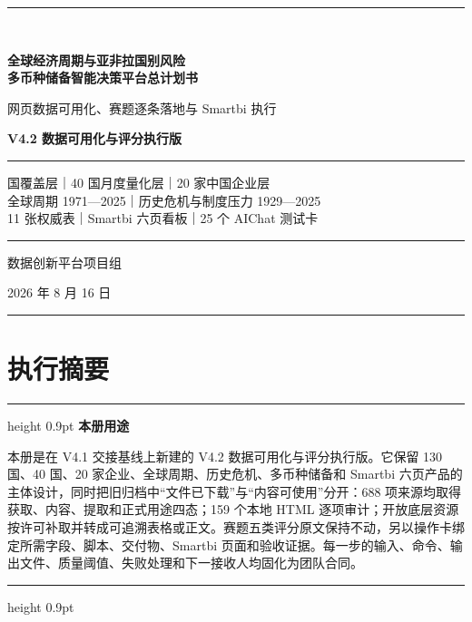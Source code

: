\documentclass[UTF8,fontset=windows,12pt,openany]{ctexbook}
\newenvironment{decisionbox}[1][]{%
  \par\medskip\noindent\begin{center}\begin{minipage}{0.93\textwidth}%
  \color{OceanBlue}\hrule height 0.9pt\vspace{0.45em}%
  \textbf{#1}\par\smallskip\color{black}%
}{%
  \par\vspace{0.35em}\color{OceanBlue}\hrule height 0.9pt%
  \end{minipage}\end{center}\medskip%
}
\begin{document}
\begin{titlepage}
  \pagecolor{PaleBlue}
  \centering
  \vspace*{1.6cm}
  {\color{OceanBlue}\rule{0.88\textwidth}{1.5pt}}\\[1.05cm]
  {\Huge\bfseries\color{DeepNavy}全球经济周期与亚非拉国别风险\\[0.35cm]多币种储备智能决策平台总计划书\par}
  \vspace{0.7cm}
  {\LARGE\color{OceanBlue}网页数据可用化、赛题逐条落地与 Smartbi 执行\par}
  \vspace{0.35cm}
  {\Large\bfseries\color{GoldLine}V4.2 数据可用化与评分执行版\par}
  \vspace{1.0cm}
  \begin{minipage}{0.86\textwidth}
    \color{GoldLine}\rule{\textwidth}{0.9pt}\par\vspace{0.45cm}
    \color{black} 国覆盖层｜40 国月度量化层｜20 家中国企业层\\[0.25cm]
    全球周期 1971—2025｜历史危机与制度压力 1929—2025\\[0.25cm]
    11 张权威表｜Smartbi 六页看板｜25 个 AIChat 测试卡
    \vspace{0.45cm}\par\color{GoldLine}\rule{\textwidth}{0.9pt}
  \end{minipage}
  \vfill
  {\large 数据创新平台项目组\par}
  \vspace{0.25cm}
  {\large 2026 年 8 月 16 日\par}
  \vspace{0.75cm}
  {\color{OceanBlue}\rule{0.88\textwidth}{1.5pt}}
  \nopagecolor
\end{titlepage}

\frontmatter

\chapter*{执行摘要}

\begin{decisionbox}[本册用途]
本册是在 V4.1 交接基线上新建的 V4.2 数据可用化与评分执行版。它保留 130 国、40 国、20 家企业、全球周期、历史危机、多币种储备和 Smartbi 六页产品的主体设计，同时把旧归档中“文件已下载”与“内容可使用”分开：688 项来源均取得获取、内容、提取和正式用途四态；159 个本地 HTML 逐项审计；开放底层资源按许可补取并转成可追溯表格或正文。赛题五类评分原文保持不动，另以操作卡绑定所需字段、脚本、交付物、Smartbi 页面和验收证据。每一步的输入、命令、输出文件、质量阈值、失败处理和下一接收人均固化为团队合同。
\end{decisionbox}
\end{document}
